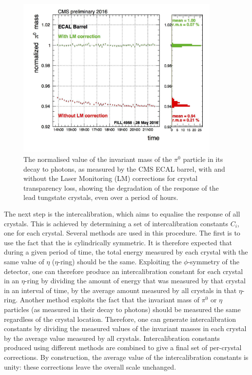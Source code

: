 \begin{figure}[h]
\centering
\includegraphics[width=0.9\textwidth]{detectorFigures/pi0_EB_plus_1.jpg}
\caption{The normalised value of the invariant mass of the $\pi^0$ particle in its decay to photons, as measured by the CMS ECAL barrel, with and without the Laser Monitoring (LM) corrections for crystal transparency loss, showing the degradation of the response of the lead tungstate crystals, even over a period of hours. \cite{CMSECALPublic}}
\label{fig:cms:ecal:pizeroLMcorr}
\end{figure}

The next step is the intercalibration, which aims to equalise the response of all crystals. This is achieved by determining a set of intercalibration constants $C_{i}$, one for each crystal. Several methods are used in this procedure. The first is to use the fact that the \CMS \ECAL is cylindrically symmetric. It is therefore expected that during a given period of time, the total energy measured by each crystal with the same value of $\eta$ ($\eta$-ring) should be the same. Exploiting the $\phi$-symmetry of the detector, one can therefore produce an intercalibration constant for each crystal in an $\eta$-ring by dividing the amount of energy that was measured by that crystal in an interval of time, by the average amount measured by all crystals in that $\eta$-ring. Another method exploits the fact that the invariant mass of $\pi^0$ or $\eta$ particles (as measured in their decay to photons) should be measured the same regardless of the crystal location. Therefore, one can generate intercalibration constants by dividing the measured values of the invariant masses in each crystal by the average value measured by all crystals. Intercalibration constants produced using different methods are combined to give a final set of per-crystal corrections. By construction, the average value of the intercalibration constants is unity: these corrections leave the overall scale unchanged.

